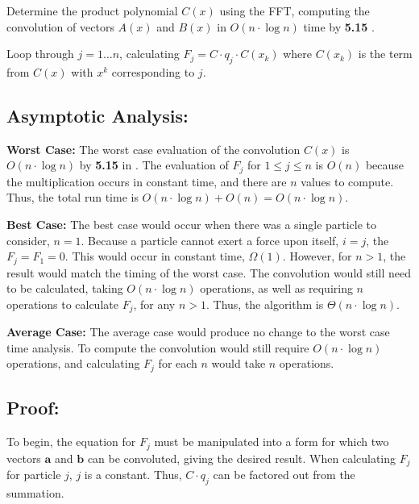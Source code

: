 \documentclass{article}
\begin{document}
Determine the product polynomial $C(x)$ using the FFT, computing the convolution of vectors $A(x)$ and $B(x)$ in $O(n \cdot \log{n})$ time by \textbf{5.15} \cite{algDesign}.

Loop through $j = 1 \dots n$, calculating $F_j = C \cdot q_j \cdot C(x_k)$ where $C(x_k)$ is the term from $C(x)$ with $x^k$ corresponding to $j$.

\subsection*{Asymptotic Analysis:}

\noindent \textbf{Worst Case:} \newline
The worst case evaluation of the convolution $C(x)$ is $O(n \cdot \log{n})$ by \textbf{5.15} in \cite{algDesign}.
The evaluation of $F_j$ for $1 \leq j \leq n$ is $O(n)$ because the multiplication occurs in constant time, and there are $n$ values to compute.
Thus, the total run time is $O(n \cdot \log{n}) + O(n) = \boxed{O(n \cdot \log{n})}$.

\noindent \textbf{Best Case:} \newline
The best case would occur when there was a single particle to consider, $n=1$.  Because a particle cannot exert a force upon itself, $i = j$, the $F_j = F_1 = 0$.  This would occur in constant time, $\boxed{ \Omega(1)}$.
However, for $n > 1$, the result would match the timing of the worst case.  The convolution would still need to be calculated, taking $O(n \cdot \log{n})$ operations, as well as requiring $n$ operations to calculate $F_j$, for any $n > 1$.  Thus, the algorithm is $\Theta(n \cdot \log{n})$.

\noindent \textbf{Average Case:} \newline
The average case would produce no change to the worst case time analysis.  To compute the convolution would still require $O(n \cdot \log{n})$ operations, and calculating $F_j$ for each $n$ would take $n$ operations.

\subsection*{Proof:}

To begin, the equation for $F_j$ must be manipulated into a form for which two vectors $\mathbf{a}$ and $\mathbf{b}$ can be convoluted, giving the desired result.  When calculating $F_j$ for particle $j$, $j$ is a constant.  Thus, $C \cdot q_j$ can be factored out from the summation.
\end{document}
